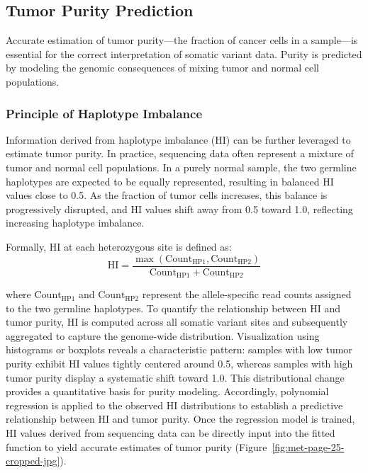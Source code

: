 \documentclass[pdflatex,sn-nature]{sn-jnl}
\begin{document}
\subsection{Tumor Purity Prediction}\label{tumor-purity-prediction}

Accurate estimation of tumor purity---the fraction of cancer cells in a sample---is essential for the correct interpretation of somatic variant data. Purity is predicted by modeling the genomic consequences of mixing tumor and normal cell populations.

\subsubsection{Principle of Haplotype Imbalance}\label{principle-of-haplotype-imbalance}

Information derived from haplotype imbalance (HI) can be further leveraged to estimate tumor purity. In practice, sequencing data often represent a mixture of tumor and normal cell populations. In a purely normal sample, the two germline haplotypes are expected to be equally represented, resulting in balanced HI values close to 0.5. As the fraction of tumor cells increases, this balance is progressively disrupted, and HI values shift away from 0.5 toward 1.0, reflecting increasing haplotype imbalance.

Formally, HI at each heterozygous site is defined as:
\[
\text{HI} = \frac{\max(\text{Count}_{\text{HP1}}, \text{Count}_{\text{HP2}})}{\text{Count}_{\text{HP1}} + \text{Count}_{\text{HP2}}}
\]

where $\text{Count}_{\text{HP1}}$ and $\text{Count}_{\text{HP2}}$ represent the allele-specific read counts assigned to the two germline haplotypes. To quantify the relationship between HI and tumor purity, HI is computed across all somatic variant sites and subsequently aggregated to capture the genome-wide distribution. Visualization using histograms or boxplots reveals a characteristic pattern: samples with low tumor purity exhibit HI values tightly centered around 0.5, whereas samples with high tumor purity display a systematic shift toward 1.0. This distributional change provides a quantitative basis for purity modeling. Accordingly, polynomial regression is applied to the observed HI distributions to establish a predictive relationship between HI and tumor purity. Once the regression model is trained, HI values derived from sequencing data can be directly input into the fitted function to yield accurate estimates of tumor purity (Figure~\ref{fig:met-page-25-cropped-jpg}).
\end{document}
